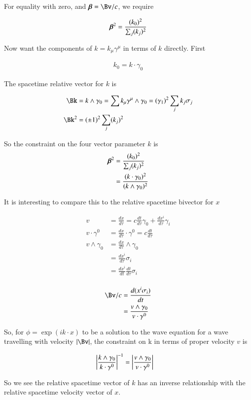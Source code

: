 \documentclass{article}
\begin{document}
For equality with zero, and $\Bbeta = \Bv/c$, we require 

\begin{align*}
\boldsymbol{\beta}^2 = \frac{(k_0)^2}{\sum_j (k_j)^2}
\end{align*}

Now want the components of $k = k_\mu \gamma^\mu$ in terms of $k$ directly.  First

\begin{align*}
k_0 = k \cdot \gamma_0
\end{align*}

The spacetime relative vector for $k$ is

\begin{align*}
\Bk &= k \wedge \gamma_0 = \sum k_\mu \gamma^\mu \wedge \gamma_0 = (\gamma_1)^2 \sum_j k_j \sigma_j \\
\Bk^2 &= (\pm 1)^2 \sum_j (k_j)^2 
\end{align*}

So the constraint on the four vector parameter $k$ is 
\begin{align*}
\boldsymbol{\beta}^2
&= \frac{(k_0)^2}{\sum_j (k_j)^2} \\
&= \frac{(k \cdot \gamma_0)^2}{(k \wedge \gamma_0)^2} \\
\end{align*}

It is interesting to compare this to the relative spacetime bivector for $x$

\begin{align*}
v &= \frac{dx}{d\tau} = c \frac{dt}{d\tau} \gamma_0 + \frac{dx^i}{d\tau} \gamma_i \\
v \cdot \gamma^0 &= \frac{dx}{d\tau} \cdot \gamma^0 = c \frac{dt}{d\tau} \\
v \wedge \gamma_0 &= \frac{dx}{d\tau} \wedge \gamma_0 \\
&= \frac{dx^i}{d\tau} \sigma_i \\
&= \frac{dx^i}{dt} \frac{dt}{d\tau} \sigma_i \\
\end{align*}

\begin{align*}
\Bv/c
&= \frac{d (x^i \sigma_i) }{dt} \\
&= \frac{v \wedge \gamma_0}{ v \cdot \gamma^0 }
\end{align*}

So, for $\phi = \exp(i k \cdot x)$ to be a solution to the wave equation for a wave travelling with velocity $\Abs{\Bv}$, the constraint on k
in terms of proper velocity $v$ is

\begin{align*}
\left\lvert{\frac{k \wedge \gamma_0}{ k \cdot \gamma^0 }}\right\rvert^{-1} &=
\left\lvert{\frac{v \wedge \gamma_0}{ v \cdot \gamma^0 }}\right\rvert
\end{align*}

So we see the relative spacetime vector of $k$ has an inverse relationship with the relative spacetime velocity vector of $x$.

%
%
\end{document}
